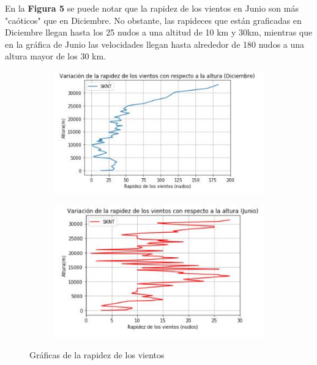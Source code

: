\documentclass[a4paper]{article}
\begin{document}
En la \textbf{Figura 5} se puede notar que la rapidez de los vientos en Junio son más "caóticos" que en Diciembre. No obstante, las rapideces que están graficadas en Diciembre llegan hasta los 25 nudos a una altitud de 10 km y 30km, mientras que en la gráfica de Junio las velocidades llegan hasta alrededor de 180 nudos a una altura mayor de los 30 km. 
\begin{figure}[ht!]
\centering
\begin{subfigure}{0.49\textwidth}
\centering
\includegraphics[width = \textwidth]{Rapidez_vientos_dec.JPG}

\end{subfigure}
\begin{subfigure}{0.49\textwidth}
\centering
\includegraphics[width = \textwidth]{Rapidez_vientos_jun.JPG}

\end{subfigure}
\caption{Gráficas de la rapidez de los vientos}
\label{fig:combined}
\end{figure}
\end{document}
